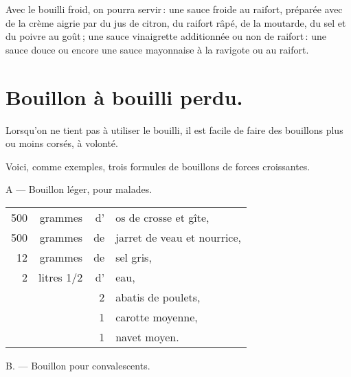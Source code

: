 Avec le bouilli froid, on pourra servir : une sauce froide au raifort, préparée
avec de la crème aigrie par du jus de citron, du raifort râpé, de la moutarde,
du sel et du poivre au goût ; une sauce vinaigrette additionnée ou non de
raifort : une sauce douce ou encore une sauce mayonnaise à la ravigote ou au
raifort.

\section*{\centering Bouillon à bouilli perdu.}
\label{pg0201} \hypertarget{p0201}{}

Lorsqu'on ne tient pas à utiliser le bouilli, il est facile de faire des
bouillons plus ou moins corsés, à volonté.

\medskip

Voici, comme exemples, trois formules de bouillons de forces croissantes.

\medskip

A — Bouillon léger, pour malades.

\footnotesize
\begin{longtable}{rrrp{16em}}
  500 & grammes    & d' & os de crosse et gîte,                                                           \\
  500 & grammes    & de & jarret de veau et nourrice,                                                     \\
   12 & grammes    & de & sel gris,                                                                       \\
    2 & litres 1/2 & d' & eau,                                                                            \\
      &            & 2  & abatis de poulets,                                                              \\
      &            & 1  & carotte moyenne,                                                                \\
      &            & 1  & navet moyen.                                                                    \\
\end{longtable}
\normalsize                                
{}
B. — Bouillon pour convalescents.

\medskip

